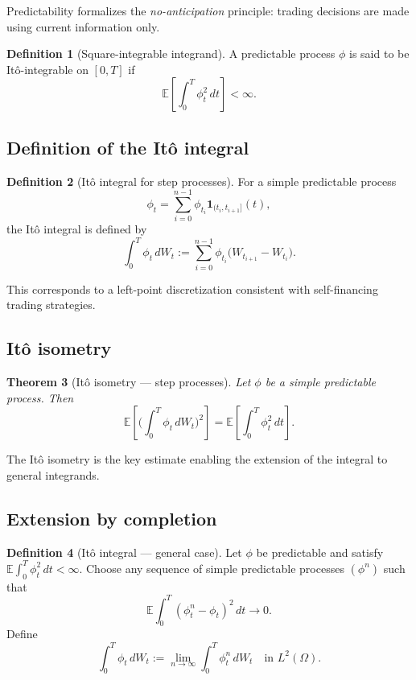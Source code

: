 \documentclass[11pt]{article}
\newcommand{\E}{\mathbb{E}}
\newcommand{\1}{\mathbf{1}}
\theoremstyle{plain}
\newtheorem{theorem}{Theorem}[section]
\theoremstyle{definition}
\newtheorem{definition}[theorem]{Definition}
\theoremstyle{remark}
\begin{document}
Predictability formalizes the \emph{no-anticipation} principle: trading decisions are made using current information only.

\begin{definition}[Square-integrable integrand]
A predictable process $\phi$ is said to be Itô-integrable on $[0,T]$ if
\[
\E\!\left[\int_0^T \phi_t^2\,dt\right] < \infty.
\]
\end{definition}

\subsection{Definition of the Itô integral}

\begin{definition}[Itô integral for step processes]
For a simple predictable process
\[
\phi_t=\sum_{i=0}^{n-1}\phi_{t_i}\mathbf 1_{(t_i,t_{i+1}]}(t),
\]
the Itô integral is defined by
\[
\int_0^T \phi_t\,dW_t
:=
\sum_{i=0}^{n-1} \phi_{t_i}\big(W_{t_{i+1}}-W_{t_i}\big).
\]
\end{definition}

This corresponds to a left-point discretization consistent with self-financing trading strategies.

\subsection{Itô isometry}

\begin{theorem}[Itô isometry — step processes]
Let $\phi$ be a simple predictable process. Then
\[
\E\!\left[\Big(\int_0^T \phi_t\,dW_t\Big)^2\right]
=
\E\!\left[\int_0^T \phi_t^2\,dt\right].
\]
\end{theorem}

The Itô isometry is the key estimate enabling the extension of the integral to general integrands.

\subsection{Extension by completion}

\begin{definition}[Itô integral — general case]
Let $\phi$ be predictable and satisfy
\(
\E\int_0^T \phi_t^2\,dt < \infty.
\)
Choose any sequence of simple predictable processes $(\phi^n)$ such that
\[
\E\int_0^T (\phi^n_t-\phi_t)^2\,dt \to 0.
\]
Define
\[
\int_0^T \phi_t\,dW_t
:=
\lim_{n\to\infty} \int_0^T \phi^n_t\,dW_t
\quad\text{in }L^2(\Omega).
\]
\end{definition}
\end{document}

